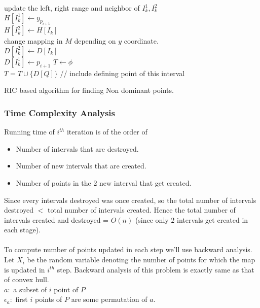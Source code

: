\documentclass[a4paper]{article}
\begin{document}
\begin{algorithm}[H]
{{      update the left, right range and neighbor of $I^1_k, I^2_k$ \\
      $H[I^1_k] \leftarrow y_{p_{i+1}}$ \\
      $H[I^2_k] \leftarrow H[I_k]$ \\
       {
         {
          change mapping in $M$ depending on $y$ coordinate. \\
        }
      }
      $D[I^2_k] \leftarrow D[I_k]$ \\
      $D[I^1_k] \leftarrow p_{i+1}$
 		}
 }
 $T \leftarrow \phi$ \\
  {
 	$T = T \cup \{ D[Q] \}$ // include defining point of this interval
 }

 \caption{RIC based algorithm for finding Non dominant points.}
\end{algorithm}
\pagebreak
\subsubsection*{Time Complexity Analysis}
Running time of $i^{th}$ iteration is of the order of
\begin{itemize}
    \item Number of intervals that are destroyed.
    \item Number of new intervals that are created.
    \item Number of points in the $2$ new interval that get created.
\end{itemize}
Since every intervals destroyed was once created, so the total number of intervals destroyed $<$ total number of intervals created. Hence the total number of intervals created and destroyed = $O(n)$ (since only $2$ intervals get created in each stage). \\ \\
To compute number of points updated in each step we'll use backward analysis. \\
Let $X_i$ be the random variable denoting the number of points for which the map is updated in $i^{th}$ step.
Backward analysis of this problem is exactly same as that of convex hull. \\
$a: $ a subset of $i$ point of $P$ \\
$\epsilon_a: $ first $i$ points of $P$ are some permutation of $a$. \\
\end{document}
